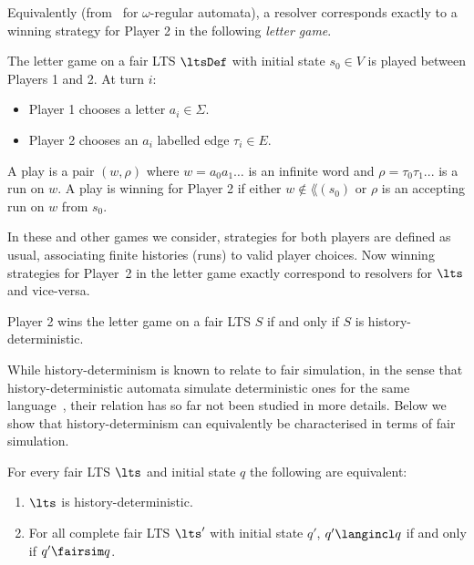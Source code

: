 Equivalently (from~\cite{BL19} for $\omega$-regular automata), a resolver corresponds exactly to a winning strategy for Player 2 in the following \textit{letter game}.
\begin{definition}
The letter game on a fair LTS $\ltsDef$ with initial state $s_0\in V$ is played between Players 1 and 2. At turn $i$:
\begin{itemize}
\item Player 1 chooses a letter $a_i\in \Sigma$.
\item Player 2 chooses an $a_i$ labelled edge $\tau_i \in E$.
\end{itemize}
A play is a pair $(w,\rho)$ where $w=a_0a_1\ldots$ is an infinite word and $\rho=\tau_0\tau_1...$ is a run on $w$. A play is winning for Player 2 if either $w\notin \lang(s_0)$ or $\rho$ is an accepting run on $w$ from $s_0$.
\end{definition}
In these and other games we consider, strategies for both players are defined as usual, associating finite histories (runs) to valid player choices.
Now winning strategies for Player~2 in the letter game
exactly correspond to resolvers for $\lts$ and vice-versa.
\begin{proposition}
Player 2 wins the letter game on a fair LTS $S$ if and only if $S$ is history-deterministic.
\end{proposition}




While history-determinism is known to relate to fair simulation, in the sense that history-deterministic automata simulate deterministic ones for the same language~\cite{HP06}, their relation has so far not been studied in more details. Below we show that history-determinism can equivalently be characterised in terms of fair simulation.


\begin{theorem}\label{thm:triangle}
For every fair LTS $\lts$ %
and initial state $q$
the following are equivalent:
\begin{enumerate}
\item \label{triangle-hd} $\lts$ is history-deterministic.
\item \label{triangle-sim}For all complete fair LTS $\lts'$ with initial state $q'$, %
    $q' \langincl q$ if and only if $q' \fairsim q$. 
\end{enumerate}
\end{theorem}

